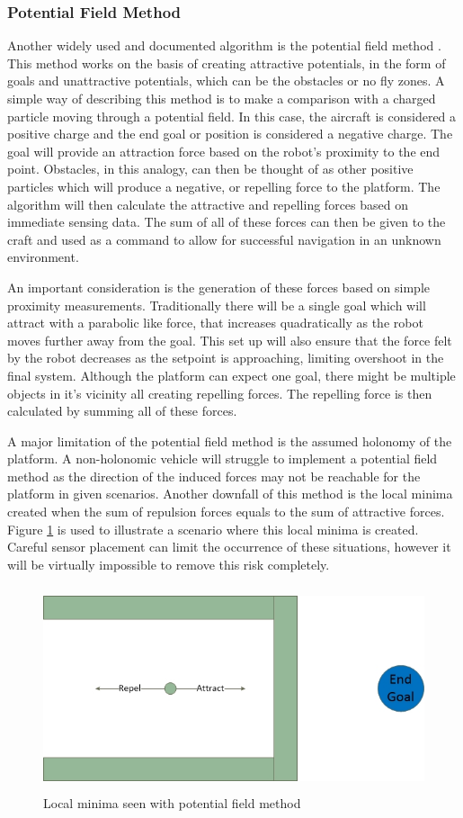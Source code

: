		\subsubsection{Potential Field Method}\label{SSECT_PotentialField}
		Another widely used and documented algorithm is the potential field method \cite{ribeiro2005obstacle}. This method works on the basis of creating attractive potentials, in the form of goals and unattractive potentials, which can be the obstacles or no fly zones. A simple way of describing this method is to make a comparison with a charged particle moving through a potential field. In this case, the aircraft is considered a positive charge and the end goal or position is considered a negative charge. The goal will provide an attraction force based on the robot's proximity to the end point. Obstacles, in this analogy, can then be thought of as other positive particles which will produce a negative, or repelling force to the platform. The algorithm will then calculate the attractive and repelling forces based on immediate sensing data. The sum of all of these forces can then be given to the craft and used as a command to allow for successful navigation in an unknown environment.
		
		An important consideration is the generation of these forces based on simple proximity measurements. Traditionally there will be a single goal which will attract with a parabolic like force, that increases quadratically as the robot moves further away from the goal. This set up will also ensure that the force felt by the robot decreases as the setpoint is approaching, limiting overshoot in the final system. Although the platform can expect one goal, there might be multiple objects in it's vicinity all creating repelling forces. The repelling force is then calculated by summing all of these forces.
		
		A major limitation of the potential field method is the assumed holonomy of the platform. A non-holonomic vehicle will struggle to implement a potential field method as the direction of the induced forces may not be reachable for the platform in given scenarios. Another downfall of this method is the local minima created when the sum of repulsion forces equals to the sum of attractive forces. Figure \ref{IM_LocalMinima} is used to illustrate a scenario where this local minima is created. Careful sensor placement can limit the occurrence of these situations, however it will be virtually impossible to remove this risk completely.
		
		\begin{figure}[H]
			\centering
			\includegraphics[height = 6cm]{../References/Diagrams/LocalMinima}     
			\caption{Local minima seen with potential field method}
			\label{IM_LocalMinima}
		\end{figure}
		
	
	
	
